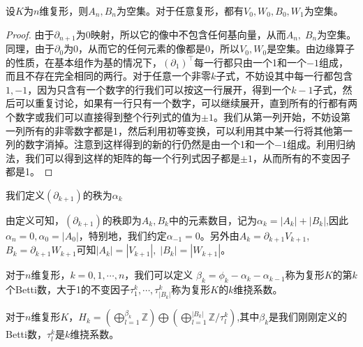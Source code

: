 \begin{proposition}
设$K$为$n$维复形，则$A_{n},B_{n}$为空集。对于任意复形，都有$V_{0},W_{0},B_{0},W_{1}$为空集。
\end{proposition}
\begin{proof}
由于$\partial_{n+1}$为0映射，所以它的像中不包含任何基向量，从而$A_{n},\;B_{n}$为空集。同理，由于$\partial_{0}$为0，从而它的任何元素的像都是0，所以$V_{0},W_{0}$是空集。由边缘算子的性质，在基本组作为基的情况下，$(\partial_{1})^{\top}$每一行都只由一个1和一个$-1$组成，而且不存在完全相同的两行。对于任意一个非零$k$子式，不妨设其中每一行都包含$1,-1$，因为只含有一个数字的行我们可以按这一行展开，得到一个$k-1$子式，然后可以重复讨论，如果有一行只有一个数字，可以继续展开，直到所有的行都有两个数字或我们可以直接得到整个行列式的值为$\pm1$。我们从第一列开始，不妨设第一列所有的非零数字都是1，然后利用初等变换，可以利用其中某一行将其他第一列的数字消掉。注意到这样得到的新的行仍然是由一个1和一个$-1$组成。利用归纳法，我们可以得到这样的矩阵的每一个行列式因子都是$\pm1$，从而所有的不变因子都是1。
\end{proof}
\begin{definition}
我们定义$(\partial_{k+1})$的秩为$\alpha_{k}$
\end{definition}
由定义可知，$(\partial_{k+1})$的秩即为$A_{k},B_{k}$中的元素数目，记为$\alpha_{k}=|A_{k}|+|B_{k}|$,因此$\alpha_{n}=0,\alpha_{0}=|A_{0}|$，特别地，我们约定$\alpha_{-1}=0$。另外由$A_{k}=\partial_{k+1}V_{k+1}$,$B_{k}=\partial_{k+1}W_{k+1}$可知$|A_{k}|=|V_{k+1}|,\;|B_{k}|=|W_{k+1}|$。
\begin{definition}
对于$n$维复形，$k=0,1,\cdots,n$，我们可以定义 $\beta_{k}=\phi_{k}-\alpha_{k}-\alpha_{k-1}$称为复形$K$的第$k$个Betti数，大于1的不变因子$\tau^{k}_{1},\cdots,\tau^{k}_{|B_{k}|}$称为复形$K$的$k$维挠系数。
\end{definition}
\begin{proposition}\label{pro902}
对于$n$维复形$K$，$H_{k}=\left(\bigoplus\limits_{l=1}^{\beta_{k}}\mathbb{Z}\right)\bigoplus\left(\bigoplus\limits_{l=1}^{|B_{k}|}\mathbb{Z}/\tau_{l}^{k}\right)$,其中$\beta_{k}$是我们刚刚定义的Betti数，$\tau_{l}^{k}$是$k$维挠系数。
\end{proposition}

